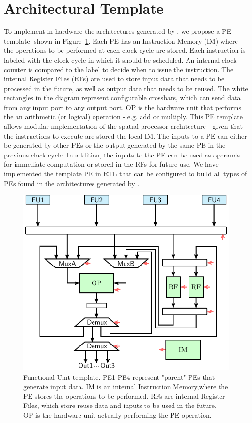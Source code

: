 \vspace{-2mm}
\section{Architectural Template}
\label{sec:arch_template}
To implement in hardware the architectures generated by \frameworkname, we propose a PE template, shown in Figure~\ref{fig:FU_templ}. Each PE has an Instruction Memory (IM) where the operations to be performed at each clock cycle are stored. Each instruction is labeled with the clock cycle in which it should be scheduled. An internal clock counter is compared to the label to decide when to issue the instruction. The internal Register Files (RFs) are used to store input data that needs to be processed in the future, as well as output data that needs to be reused. The white rectangles in the diagram represent configurable crossbars, which can send data from any input port to any output port. OP is the hardware unit that performs the an arithmetic (or logical) operation - e.g. add or multiply.
This PE template allows modular implementation of the spatial processor architecture - given that the instructions to execute are stored the local IM. The inputs to a PE can either be generated by other PEs or the output generated by the same PE in the previous clock cycle. In addition, the inputs to the PE can be used as operands for immediate computation or stored in the RFs for future use. We have implemented the template PE in RTL that can be configured to build all types of PEs found in the architectures generated by \frameworkname.

\begin{figure}[tb]
\centering
\includegraphics[width=.7\columnwidth]{images/functional_unit.pdf}
    \caption{\small Functional Unit template. PE1-PE4 represent "parent" PEs that generate input data. IM is an internal Instruction Memory,where the PE stores the operations to be performed. RFs are internal Register Files, which store reuse data and inputs to be used in the future. OP is the hardware unit actually performing the PE operation.}
\label{fig:FU_templ}
\end{figure}
